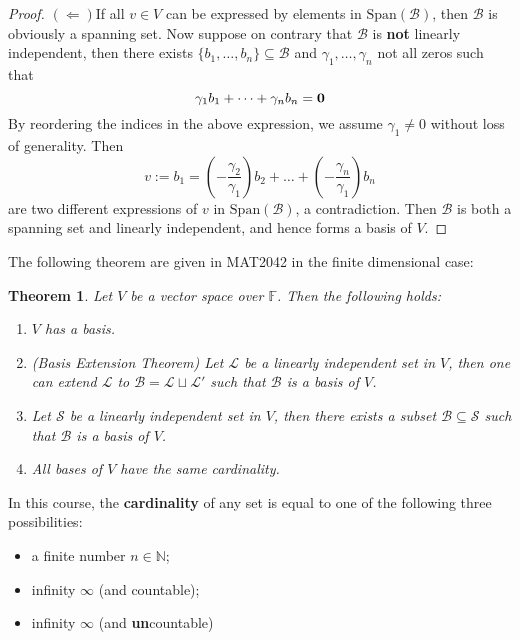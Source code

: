 \documentclass[11pt,openany]{book}
\theoremstyle{plain}
\newtheorem{theorem}{Theorem}[chapter]
\theoremstyle{definition}
\theoremstyle{remark}
\begin{document}
\begin{proof}
    \noindent $(\Leftarrow) $If all $v \in V$ can be expressed by elements in $\mathrm{Span}(\mathcal{B})$, then $\mathcal{B}$ is obviously a spanning set. Now suppose on contrary that $\mathcal{B}$ is {\bf not} linearly independent, then there exists $\{b_1,\dots, b_n\} \subseteq \mathcal{B}$ and $\gamma_1, \dots, \gamma_n$ not all zeros such that
    $$\gamma_1b_1 + \dots + \gamma_nb_n = {\bf 0}$$
    By reordering the indices in the above expression, we assume $\gamma_1 \neq 0$ without loss of generality. Then
    $$v := b_1 = (-\frac{\gamma_2}{\gamma_1}) b_2 + \dots + (-\frac{\gamma_n}{\gamma_1})b_n$$
    are two different expressions of $v$ in $\mathrm{Span}(\mathcal{B})$, a contradiction. Then $\mathcal{B}$ is both a spanning set and linearly independent, and hence forms a basis of $V$.
\end{proof}

The following theorem are given in MAT2042 in the finite dimensional case:
\begin{theorem} \label{thm-basisextension}
    Let $V$ be a vector space over $\mathbb{F}$. Then the following holds:
    \begin{enumerate}
        \item $V$ has a basis.
        \item (Basis Extension Theorem) Let $\mathcal{L}$ be a linearly independent set in $V$, then one can extend $\mathcal{L}$ to $\mathcal{B} = \mathcal{L} \sqcup \mathcal{L}'$ such that $\mathcal{B}$ is a basis of $V$.
        \item Let $\mathcal{S}$ be a linearly independent set in $V$, then there exists a subset $\mathcal{B} \subseteq \mathcal{S}$ such that $\mathcal{B}$ is a basis of $V$.
        \item All bases of $V$ have the same cardinality.
    \end{enumerate}
\end{theorem}
In this course, the {\bf cardinality} of any set is equal to one of the following three possibilities:
\begin{itemize}
    \item a finite number $n \in \mathbb{N}$;
    \item infinity $\infty$ (and countable);
    \item infinity $\infty$ (and {\bf un}countable)
\end{itemize}
\end{document}
